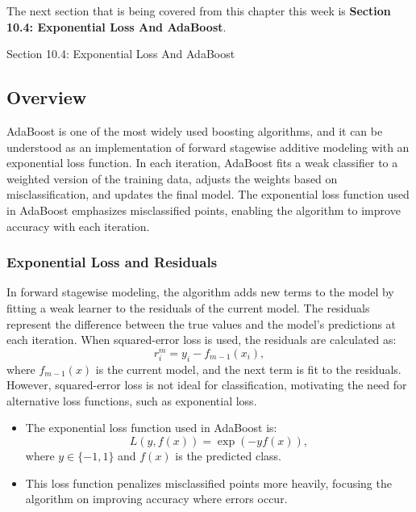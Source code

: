 The next section that is being covered from this chapter this week is \textbf{Section 10.4: Exponential Loss And AdaBoost}.

\begin{notes}{Section 10.4: Exponential Loss And AdaBoost}
    \subsection*{Overview}

    AdaBoost is one of the most widely used boosting algorithms, and it can be understood as an implementation of forward stagewise additive modeling with an exponential loss function. In each iteration, 
    AdaBoost fits a weak classifier to a weighted version of the training data, adjusts the weights based on misclassification, and updates the final model. The exponential loss function used in AdaBoost 
    emphasizes misclassified points, enabling the algorithm to improve accuracy with each iteration.
    
    \subsubsection*{Exponential Loss and Residuals}
    
    In forward stagewise modeling, the algorithm adds new terms to the model by fitting a weak learner to the residuals of the current model. The residuals represent the difference between the true values 
    and the model's predictions at each iteration. When squared-error loss is used, the residuals are calculated as:
    \[
    r_i^m = y_i - f_{m-1}(x_i),
    \]
    where $f_{m-1}(x)$ is the current model, and the next term is fit to the residuals. However, squared-error loss is not ideal for classification, motivating the need for alternative loss functions, 
    such as exponential loss.
    
    \begin{highlight}
        \begin{itemize}
            \item The exponential loss function used in AdaBoost is:
            \[
            L(y, f(x)) = \exp(-y f(x)),
            \]
            where $y \in \{-1, 1\}$ and $f(x)$ is the predicted class.
            \item This loss function penalizes misclassified points more heavily, focusing the algorithm on improving accuracy where errors occur.
        \end{itemize}
    \end{highlight}
    

\end{notes}
